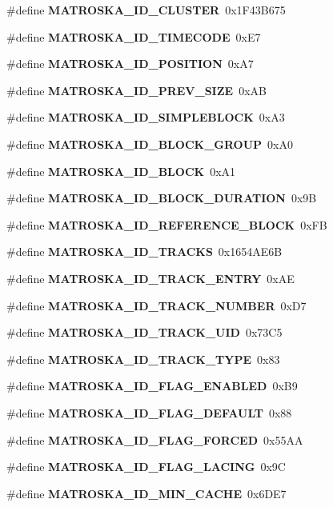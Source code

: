 \begin{DoxyCompactItemize}
\#define {\bf M\+A\+T\+R\+O\+S\+K\+A\+\_\+\+I\+D\+\_\+\+C\+L\+U\+S\+T\+E\+R}~0x1\+F43\+B675
\item 
\#define {\bf M\+A\+T\+R\+O\+S\+K\+A\+\_\+\+I\+D\+\_\+\+T\+I\+M\+E\+C\+O\+D\+E}~0x\+E7
\item 
\#define {\bf M\+A\+T\+R\+O\+S\+K\+A\+\_\+\+I\+D\+\_\+\+P\+O\+S\+I\+T\+I\+O\+N}~0x\+A7
\item 
\#define {\bf M\+A\+T\+R\+O\+S\+K\+A\+\_\+\+I\+D\+\_\+\+P\+R\+E\+V\+\_\+\+S\+I\+Z\+E}~0x\+A\+B
\item 
\#define {\bf M\+A\+T\+R\+O\+S\+K\+A\+\_\+\+I\+D\+\_\+\+S\+I\+M\+P\+L\+E\+B\+L\+O\+C\+K}~0x\+A3
\item 
\#define {\bf M\+A\+T\+R\+O\+S\+K\+A\+\_\+\+I\+D\+\_\+\+B\+L\+O\+C\+K\+\_\+\+G\+R\+O\+U\+P}~0x\+A0
\item 
\#define {\bf M\+A\+T\+R\+O\+S\+K\+A\+\_\+\+I\+D\+\_\+\+B\+L\+O\+C\+K}~0x\+A1
\item 
\#define {\bf M\+A\+T\+R\+O\+S\+K\+A\+\_\+\+I\+D\+\_\+\+B\+L\+O\+C\+K\+\_\+\+D\+U\+R\+A\+T\+I\+O\+N}~0x9\+B
\item 
\#define {\bf M\+A\+T\+R\+O\+S\+K\+A\+\_\+\+I\+D\+\_\+\+R\+E\+F\+E\+R\+E\+N\+C\+E\+\_\+\+B\+L\+O\+C\+K}~0x\+F\+B
\item 
\#define {\bf M\+A\+T\+R\+O\+S\+K\+A\+\_\+\+I\+D\+\_\+\+T\+R\+A\+C\+K\+S}~0x1654\+A\+E6\+B
\item 
\#define {\bf M\+A\+T\+R\+O\+S\+K\+A\+\_\+\+I\+D\+\_\+\+T\+R\+A\+C\+K\+\_\+\+E\+N\+T\+R\+Y}~0x\+A\+E
\item 
\#define {\bf M\+A\+T\+R\+O\+S\+K\+A\+\_\+\+I\+D\+\_\+\+T\+R\+A\+C\+K\+\_\+\+N\+U\+M\+B\+E\+R}~0x\+D7
\item 
\#define {\bf M\+A\+T\+R\+O\+S\+K\+A\+\_\+\+I\+D\+\_\+\+T\+R\+A\+C\+K\+\_\+\+U\+I\+D}~0x73\+C5
\item 
\#define {\bf M\+A\+T\+R\+O\+S\+K\+A\+\_\+\+I\+D\+\_\+\+T\+R\+A\+C\+K\+\_\+\+T\+Y\+P\+E}~0x83
\item 
\#define {\bf M\+A\+T\+R\+O\+S\+K\+A\+\_\+\+I\+D\+\_\+\+F\+L\+A\+G\+\_\+\+E\+N\+A\+B\+L\+E\+D}~0x\+B9
\item 
\#define {\bf M\+A\+T\+R\+O\+S\+K\+A\+\_\+\+I\+D\+\_\+\+F\+L\+A\+G\+\_\+\+D\+E\+F\+A\+U\+L\+T}~0x88
\item 
\#define {\bf M\+A\+T\+R\+O\+S\+K\+A\+\_\+\+I\+D\+\_\+\+F\+L\+A\+G\+\_\+\+F\+O\+R\+C\+E\+D}~0x55\+A\+A
\item 
\#define {\bf M\+A\+T\+R\+O\+S\+K\+A\+\_\+\+I\+D\+\_\+\+F\+L\+A\+G\+\_\+\+L\+A\+C\+I\+N\+G}~0x9\+C
\item 
\#define {\bf M\+A\+T\+R\+O\+S\+K\+A\+\_\+\+I\+D\+\_\+\+M\+I\+N\+\_\+\+C\+A\+C\+H\+E}~0x6\+D\+E7

\end{DoxyCompactItemize}
